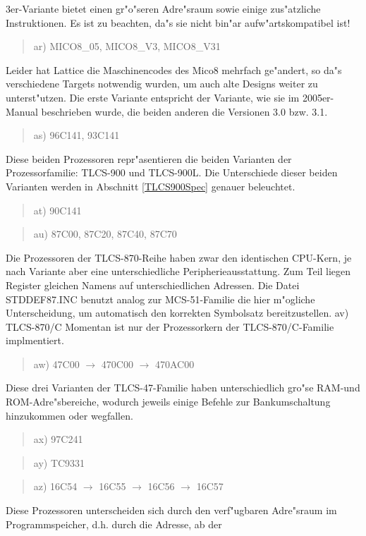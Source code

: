 \documentclass[12pt,a4paper,twoside]{report}
\begin{document}
3er-Variante bietet einen gr"o"seren Adre"sraum sowie einige zus"atzliche
Instruktionen.  Es ist zu beachten, da"s sie nicht bin"ar
aufw"artskompatibel ist!
\begin{quote}
ar) MICO8\_05, MICO8\_V3, MICO8\_V31
\end{quote}
Leider hat Lattice die Maschinencodes des Mico8 mehrfach ge"andert, so
da"s verschiedene Targets notwendig wurden, um auch alte Designs weiter
zu unterst"utzen.  Die erste Variante entspricht der Variante, wie sie
im 2005er-Manual beschrieben wurde, die beiden anderen die Versionen 3.0
bzw. 3.1.
\begin{quote}
as) 96C141, 93C141
\end{quote}
Diese beiden Prozessoren repr"asentieren die beiden Varianten der
Prozessorfamilie: TLCS-900 und TLCS-900L.  Die Unterschiede dieser beiden
Varianten werden in Abschnitt \ref{TLCS900Spec} genauer beleuchtet.
\begin{quote}
at) 90C141
\end{quote}
\begin{quote}
au) 87C00, 87C20, 87C40, 87C70
\end{quote}
Die Prozessoren der TLCS-870-Reihe haben zwar den identischen CPU-Kern, je
nach Variante aber eine unterschiedliche Peripherieausstattung.  Zum
Teil liegen Register gleichen Namens auf unterschiedlichen Adressen.
Die Datei STDDEF87.INC benutzt analog zur MCS-51-Familie die hier
m"ogliche Unterscheidung, um automatisch den korrekten Symbolsatz
bereitzustellen.
av) TLCS-870/C
Momentan ist nur der Prozessorkern der TLCS-870/C-Familie implmentiert.
\begin{quote}
aw) 47C00 $\rightarrow$ 470C00 $\rightarrow$ 470AC00
\end{quote}
Diese drei Varianten der TLCS-47-Familie haben unterschiedlich gro"se
RAM-und ROM-Adre"sbereiche, wodurch jeweils einige Befehle zur
Bankumschaltung hinzukommen oder wegfallen.
\begin{quote}
ax) 97C241
\end{quote}
\begin{quote}
ay) TC9331
\end{quote}
\begin{quote}
az) 16C54 $\rightarrow$ 16C55 $\rightarrow$ 16C56 $\rightarrow$ 16C57
\end{quote}
Diese Prozessoren unterscheiden sich durch den verf"ugbaren
Adre"sraum im Programmspeicher, d.h. durch die Adresse, ab der
\end{document}
